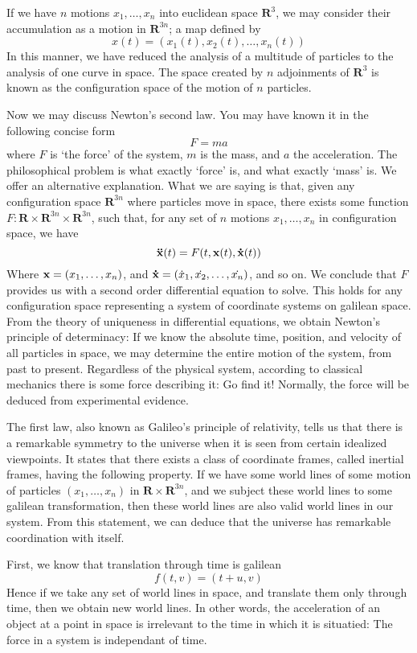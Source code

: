 \documentclass{article}
\begin{document}
If we have $n$ motions $x_1, \dots, x_n$ into euclidean space $\mathbf{R}^3$, we may consider their accumulation as a motion in $\mathbf{R}^{3n}$; a map defined by
%
\[ x(t) = (x_1(t), x_2(t), \dots, x_n(t)) \]
%
In this manner, we have reduced the analysis of a multitude of particles to the analysis of one curve in space. The space created by $n$ adjoinments of $\mathbf{R}^3$ is known as the configuration space of the motion of $n$ particles.

Now we may discuss Newton's second law. You may have known it in the following concise form
%
\[ F = ma \]
%
where $F$ is `the force' of the system, $m$ is the mass, and $a$ the acceleration. The philosophical problem is what exactly `force' is, and what exactly `mass' is. We offer an alternative explanation. What we are saying is that, given any configuration space $\mathbf{R}^{3n}$ where particles move in space, there exists some function $F:\mathbf{R} \times \mathbf{R}^{3n} \times \mathbf{R}^{3n}$, such that, for any set of $n$ motions $x_1, \dots, x_n$ in configuration space, we have
%
\[ {\bf \ddot{x}}(t) = F(t, {\bf x}(t), {\bf \dot{x}}(t)) \]
%
Where ${\bf x} = (x_1, \dots, x_n)$, and ${\bf \dot{x}} = (\dot{x}_1, \dot{x_2}, \dots, \dot{x_n})$, and so on. We conclude that $F$ provides us with a second order differential equation to solve. This holds for any configuration space representing a system of coordinate systems on galilean space. From the theory of uniqueness in differential equations, we obtain Newton's principle of determinacy: If we know the absolute time, position, and velocity of all particles in space, we may determine the entire motion of the system, from past to present. Regardless of the physical system, according to classical mechanics there is some force describing it: Go find it! Normally, the force will be deduced from experimental evidence.

The first law, also known as Galileo's principle of relativity, tells us that there is a remarkable symmetry to the universe when it is seen from certain idealized viewpoints. It states that there exists a class of coordinate frames, called inertial frames, having the following property. If we have some world lines of some motion of particles $(x_1, \dots, x_n)$ in $\mathbf{R} \times \mathbf{R}^{3n}$, and we subject these world lines to some galilean transformation, then these world lines are also valid world lines in our system. From this statement, we can deduce that the universe has remarkable coordination with itself.

First, we know that translation through time is galilean
%
\[ f(t,v) = (t + u,v) \]
%
Hence if we take any set of world lines in space, and translate them only through time, then we obtain new world lines. In other words, the acceleration of an object at a point in space is irrelevant to the time in which it is situatied: The force in a system is independant of time.
\end{document}

